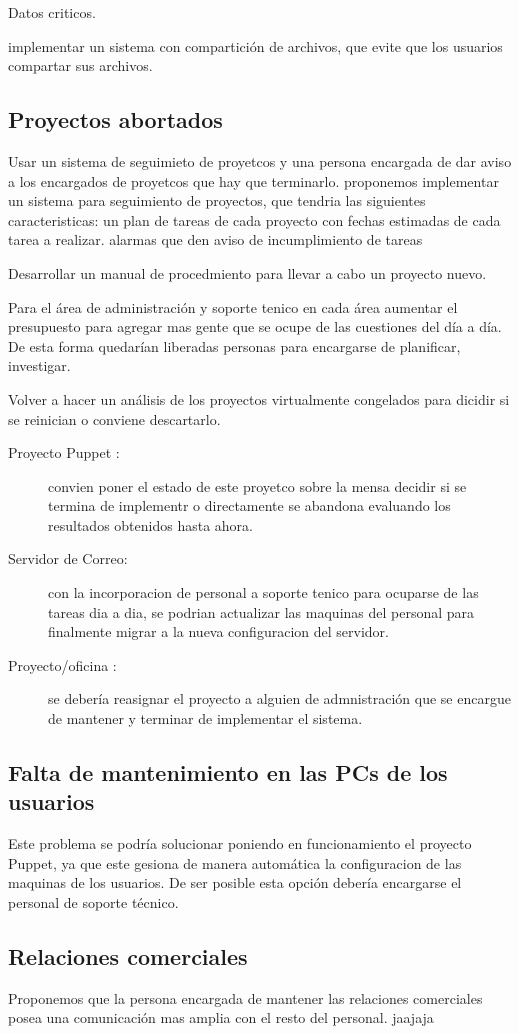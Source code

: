\documentclass[a4paper,11pt,oneside]{article}
\begin{document}
Datos criticos.

implementar un sistema con compartición de archivos, que evite que los usuarios compartar sus archivos.

\subsection*{Proyectos abortados}
Usar un sistema de seguimieto de proyetcos y una persona encargada de dar aviso a los encargados de proyetcos que hay que terminarlo.
proponemos  implementar un sistema para seguimiento de proyectos, que tendria las siguientes caracteristicas:
un plan de tareas de cada proyecto con fechas estimadas de cada tarea a realizar.
alarmas que den aviso de incumplimiento de tareas

Desarrollar un manual de procedmiento para llevar a cabo un proyecto nuevo.

Para el área de administración y soporte tenico en cada área aumentar el presupuesto para agregar mas gente que se ocupe de las cuestiones del día a día. De esta forma quedarían liberadas personas para encargarse de planificar, investigar.

Volver a hacer un análisis de los proyectos virtualmente congelados para dicidir si se reinician o conviene descartarlo.


\begin{description}
\item[Proyecto Puppet :]convien poner el estado de este proyetco sobre la mensa  decidir si se termina de implementr o directamente se abandona evaluando los resultados obtenidos hasta ahora.
\item[Servidor de Correo:] con la incorporacion de personal a soporte tenico para ocuparse de las tareas dia a dia, se podrian actualizar las maquinas del personal para finalmente migrar a la nueva configuracion del servidor.
\item[Proyecto/oficina :]se debería reasignar el proyecto a alguien de admnistración que se encargue de mantener y terminar de implementar el sistema.
\end{description}

\subsection*{Falta de mantenimiento en las PCs de los usuarios}
Este problema se podría solucionar poniendo en funcionamiento el proyecto Puppet, ya que este gesiona de manera automática la configuracion de las maquinas de los usuarios.
De ser posible esta opción debería encargarse el personal de soporte técnico.
\subsection*{Relaciones comerciales}
Proponemos que la persona encargada de mantener las relaciones comerciales posea una comunicación mas amplia con el resto del personal. jaajaja
\end{document}
